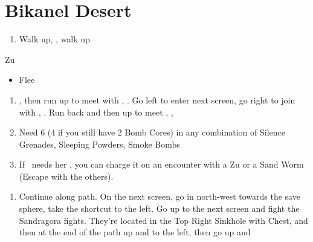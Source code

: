 \chapter{Bikanel Desert}

\begin{enumerate}
    \item Walk up, \sd, walk up
\end{enumerate}
\begin{battle}{Zu}
    \begin{itemize}
        \tidusf Attack
        \enemyf Attack
        \tidusf Equip Sonic Steel
        \tidusf Defend until \lulu\ shows up
        \auronf Defend until \lulu\ shows up
        \item Flee
    \end{itemize}
\end{battle}
\begin{enumerate}[resume]
    \item \sd, then run up to meet with \wakka, \sd. Go left to enter next screen, go right to join with \kimahri, \sd. Run back and then up to meet \rikku, \sd, \save
    \item Need 6 (4 if you still have 2 Bomb Cores) in any combination of Silence Grenades, Sleeping Powders, Smoke Bombs
    \item If \rikku\ needs her \od, you can charge it on an encounter with a Zu or a Sand Worm (Escape with the others).
\end{enumerate}
\begin{enumerate}[resume]
    \item Continue along path. On the next screen, go in north-west towards the save sphere, take the shortcut to the left. Go up to the next screen and fight the Sandragora fights. They're located in the Top Right Sinkhole with Chest, and then at the end of the path up and to the left, then go up and \sd
\end{enumerate}
\winvfill

